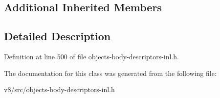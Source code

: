 \subsection*{Additional Inherited Members}


\subsection{Detailed Description}


Definition at line 500 of file objects-\/body-\/descriptors-\/inl.\+h.



The documentation for this class was generated from the following file\+:\begin{DoxyCompactItemize}
\item 
v8/src/objects-\/body-\/descriptors-\/inl.\+h\end{DoxyCompactItemize}
